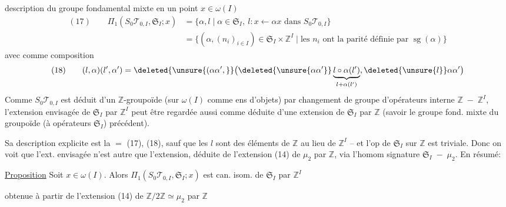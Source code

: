 description du groupe fondamental mixte en un point $x\in\omega(I)$
\[
\begin{aligned}
(17)\qquad\Pi_1(S_0\mathcal T_{0,I},\mathfrak S_I;x)
&=\{\alpha,l\mid\alpha\in\mathfrak S_I,\ l:x\longleftarrow\alpha x\text{ dans }S_0\mathcal T_{0,I}\}\\
&=\{(\alpha,(n_i)_{i\in I})\in\mathfrak S_I\times\mathbb Z^I\mid\text{les }n_i\text{ ont la parité définie par }\operatorname{sg}(\alpha)\}
\end{aligned}
\]
avec comme composition
\[
(18)\qquad(l,\alpha)(l',\alpha')=
\deleted{\unsure{(\alpha\alpha',}}
\bigl(\deleted{\unsure{\alpha\alpha'}}\underbrace{l\circ\alpha(l')}_{l+\alpha(l')},\deleted{\unsure{l}}\alpha\alpha'\bigr)
\]
Comme  $S_0\mathcal T_{0,I}$ est déduit d'un $\mathbb Z$-groupoïde (sur $\omega(I)$ comme ens d'objets) par changement de groupe d'opérateurs interne $\mathbb Z\;-\;\mathbb Z^I$, l'extension envisagée de $\mathfrak S_I$ par $\mathbb Z^I$ peut être regardée aussi comme déduite d'une extension de $\mathfrak S_I$ par $\mathbb Z$ (savoir le groupe fond. mixte  du groupoïde (à opérateurs $\mathfrak S_I$) précédent).

Sa description explicite est la $=$  (17), (18), sauf que les $l$ sont des éléments de $\mathbb Z$ au lieu de $\mathbb Z^I$ -- et l'op de $\mathfrak S_I$ sur $\mathbb Z$  est triviale. Donc on voit que l'ext. envisagée n'est autre que l'extension, déduite de l'extension (14) de $\mu_2$ par $\mathbb Z$, via l'homom signature $\mathfrak S_I\;-\;\mu_2$. En résumé:

\uline{Proposition} Soit $x\in\omega(I)$. Alors $\Pi_1(S_0\mathcal T_{0,I},\mathfrak S_I;x)$ est can. isom.  de $\mathfrak S_I$ par $\mathbb Z^I$

obtenue à partir de l'extension (14) de $\mathbb Z/2\mathbb Z\simeq\mu_2$ par $\mathbb Z$


